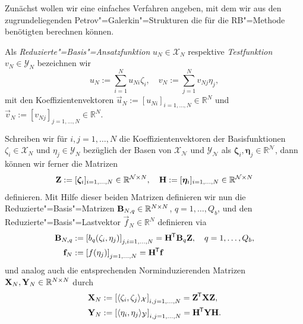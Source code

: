 \documentclass[../main.tex]{subfiles}
\begin{document}
Zunächst wollen wir eine einfaches Verfahren angeben, mit dem wir aus den zugrundeliegenden Petrov"=Galerkin"=Strukturen die für die RB"=Methode benötigten berechnen können.

\begin{Definition}
    Als \emph{Reduzierte"=Basis"=Ansatzfunktion} $u_{N} \in \mathcal X_{N}$ respektive \emph{Testfunktion} $v_{N} \in \mathcal Y_{N}$ bezeichnen wir
    \begin{equation}
        u_{N} := \sum_{i = 1}^{N} u_{N i} \zeta_{i},
        \quad
        v_{N} := \sum_{j = 1}^{N} v_{N j} \eta_{j},
    \end{equation}
    mit den Koeffizientenvektoren $\vec{u}_{N} := [u_{Ni}]_{i = 1, \dots, N} \in \mathbb{R}^{N}$ und $\vec{v}_{N} := [v_{Nj}]_{j = 1, \dots, N} \in \mathbb{R}^{N}$.
\end{Definition}

Schreiben wir für $i,j = 1, \dots, N$ die Koeffizientenvektoren der Basisfunktionen $\zeta_{i} \in \mathcal X_{N}$ und $\eta_{j} \in \mathcal Y_{N}$ bezüglich der Basen von $\mathcal X_{\mathcal N}$ und $\mathcal Y_{\mathcal N}$  als $\bm \zeta_{i}, \bm \eta_{j} \in \mathbb{R}^{\mathcal N}$, dann können wir ferner die Matrizen
\begin{equation}
  \mathbf{Z} := [\bm \zeta_{i}]_{i = 1, \dots, N} \in \mathbb{R}^{\mathcal N \times N}, \quad \mathbf{H} := [\bm \eta_{i}]_{i = 1, \dots, N} \in \mathbb{R}^{\mathcal N \times N}
\end{equation}
definieren.
Mit Hilfe dieser beiden Matrizen definieren wir nun die Reduzierte"=Basis"=Matrizen $\mathbf{B}_{N, q} \in \mathbb{R}^{N \times N}$, $q = 1, \dots, Q_{b}$, und den Reduzierte"=Basis"=Lastvektor $\vec{f}_{N} \in \mathbb{R}^{N}$ definieren via
\begin{equation}
    \begin{aligned}
        \mathbf{B}_{N,q} &:= \left[ b_{q}(\zeta_{i}, \eta_{j}) \right]_{j, i = 1, \dots, N} = \mathbf{H}^{\mkern-1.5mu\mathsf{T}} \mathbf{B}_{q} \mathbf{Z}, \quad q = 1, \dots, Q_{b}, \\
        \mathbf{f}_{N} &:= \left[ f(\eta_{j}) \right]_{j = 1, \dots, N} = \mathbf{H}^{\mkern-1.5mu\mathsf{T}} \mathbf{f}
    \end{aligned}
\end{equation}
und analog auch die entsprechenden Norminduzierenden Matrizen $\mathbf{X}_{N}, \mathbf{Y}_{N} \in \mathbb{R}^{N \times N}$ durch
\begin{equation}
    \begin{aligned}
    \mathbf{X}_{N} &:= \left[ \langle\zeta_{i},\zeta_{j}\rangle_{\mathcal X} \right]_{i,j = 1, \dots, N} = \mathbf{Z}^{\mkern-1.5mu\mathsf{T}} \mathbf{X} \mathbf{Z}, \\
    \mathbf{Y}_{N} &:= \left[ \langle\eta_{i},\eta_{j}\rangle_{\mathcal Y} \right]_{i,j = 1, \dots, N} = \mathbf{H}^{\mkern-1.5mu\mathsf{T}} \mathbf{Y} \mathbf{H}.
    \end{aligned}
\end{equation}
\end{document}
